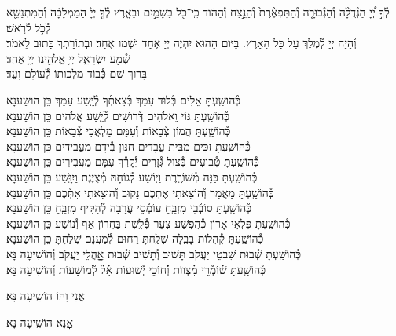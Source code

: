 \documentclass[twoside, openany, parskip=half, 11pt]{book}
\begin{document}
לְ֯ךָ֣ יְ֠יָ הַגְּ֯דֻלָּ֨ה וְ֯הַגְּ֯בוּרָ֤ה וְ֯הַתִּפְאֶ֨רֶת֙ וְ֯הַנֵּ֣צַח וְ֯הַה֔וֹד
כִּֽי־כֹ֖ל בַּשָּׁמַ֣יִם וּבָאָ֑רֶץ לְ֯ךָ֤ יְיָ֙ הַמַּמְלָכָ֔ה
וְ֯הַמִּתְנַשֵּׂ֖א לְ֯כֹ֥ל לְ֯רֹֽאשׁ׃\\
וְ֯הָיָה יְיָ לְ֯מֶלֶךְ עַל כָּל הָאָרֶץ. בַּיּום הַהוּא יִהְיֶה יְיָ אֶחָד וּשְׁמו אֶחָד׃ וּבְתוֹרָתְךָ כָּתוּב לֵאמֹר׃ \\
שְׁ֯מַ֖ע יִשְׂרָאֵ֑ל יְיָ֥ אֱלֹהֵ֖ינוּ יְיָ֥ אֶחָֽד׃\\
בָּרוּךְ שֵׁם כְּ֯בוֹד מַלְכוּתוֹ לְ֯עוֹלָם וָעֶד׃

\begin{small}
כְּ֯הוֹשַֽׁעְתָּ אֵלִים בְּ֯לוּד עִמָּךְ בְּ֯צֵאתְ֯ךָ לְ֯יֵֽשַׁע עַמָּךְ \hfill כֵּן הוֹשַׁענָא׃ \\
כְּ֯הוֹשַֽׁעְתָּ גּוֹי וֵאלֹהִים דְּ֯רוּשִׁים לְ֯יֵֽשַׁע אֱלֹהִים \hfill כֵּן הוֹשַׁענָא׃ \\
כְּ֯הוֹשַֽׁעְתָּ הֲמוֹן צְ֯בָאוֹת וְ֯עִמָּם מַלְאֲכֵי צְ֯בָאוֹת \hfill כֵּן הוֹשַׁענָא׃ \\
כְּ֯הוֹשַֽׁעְתָּ זַכִּים מִבֵּית עֲבָדִים חַנּוּן בְּ֯יָדָם מַעֲבִידִים \hfill כֵּן הוֹשַׁענָא׃ \\
כְּ֯הוֹשַֽׁעְתָּ טְ֯בוּעִים בְּ֯צוּל גְּ֯זָרִים יְ֯קָרְ֯ךָ עִמָּם מַעֲבִירִים \hfill כֵּן הוֹשַׁענָא׃ \\
כְּ֯הוֹשַֽׁעְתָּ כַּנָּה מְ֯שׁוֹרֶֽרֶת וַיּֽוֹשַׁע לְ֯גוֹחָהּ מְ֯צֻיֶּנֶת וַיִוָּֽשַׁע \hfill כֵּן הוֹשַׁענָא׃ \\
כְּ֯הוֹשַֽׁעְתָּ מַאֲמַר וְ֯הוֹצֵאתִי אֶתְכֶם נָקוּב וְ֯הוּצֵאתִי אִתְּ֯כֶם \hfill כֵּן הוֹשַׁענָא׃\\
כְּ֯הוֹשַֽׁעְתָּ סוֹבְ֯בֵי מִזְבֵּֽחַ עוֹמְ֯סֵי עֲרָבָה לְ֯הַקִּיף מִזְבֵּֽחַ \hfill כֵּן הוֹשַׁענָא׃ \\
כְּ֯הוֹשַֽׁעְתָּ פִּלְאֵי אָרוֹן כְּ֯הֻפְשַׁע צִעֵר פְּ֯לֶֽשֶׁת בַּחֲרוֹן אַף וְ֯נוֹשַׁע \hfill כֵּן הוֹשַׁענָא׃ \\
כְּ֯הוֹשַֽׁעְתָּ קְ֯הִלּוֹת בָּבֶֽלָה שִׁלַּֽחְתָּ רַחוּם לְ֯מַעֲנָם שֻׁלַּחְתָּ \hfill כֵּן הוֹשַׁענָא׃\\
כְּ֯הוֹשַֽׁעְתָּ שְׁ֯בוּת שִׁבְטֵי יַעֲקֹב תָּשׁוּב וְ֯תָשִׁיב שְׁ֯בוּת אׇׇׇׇהֳלֵי יַעֲקֹב \hfill וְ֯הוֹשִׁיעָה נָּא׃\\
כְּ֯הוֹשַֽׁעְתָּ שׁ֗וֹמְ֯רֵי מִ֗צְווֹת וְ֯֗חוֹכֵי יְ֯שׁוּעוֹת אֵ֗ל֗ לְ֯מוֹשָׁעוֹת \hfill וְ֯הוֹשִׁיעָה נָּא׃

\end{small}

\begin{large}
\chazzan
אֲנִי וָהוֹ הוֹשִֽיעָה נָּא׃

\shatzvkahal
אׇׇׇׇָנָּא הוֹשִֽׁיעָה נָּא׃

\end{large}
\end{document}
